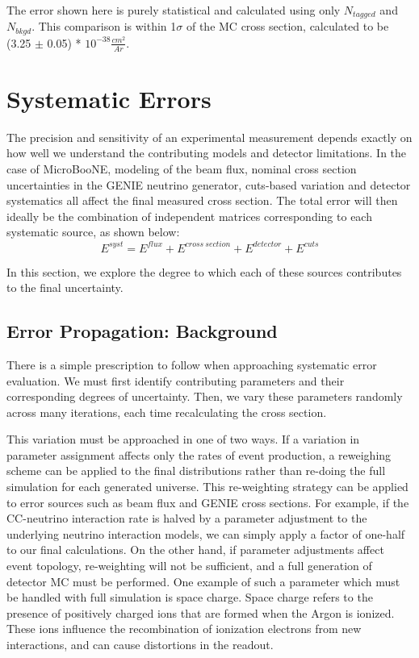 \documentclass[12pt]{article}
\begin{document}
The error shown here is purely statistical and calculated using only $N_{tagged}$ and $N_{bkgd}$. This comparison is within 1$\sigma$ of the MC cross section, calculated to be (3.25 $\pm$ 0.05) * $10^{-38} \frac{cm^2}{Ar}$.

\clearpage
\section{Systematic Errors}
The precision and sensitivity of an experimental measurement depends exactly on how well we understand the contributing models and detector limitations. In the case of MicroBooNE, modeling of the beam flux, nominal cross section uncertainties in the GENIE neutrino generator, cuts-based variation and detector systematics all affect the final measured cross section. The total error will then ideally be the combination of independent matrices corresponding to each systematic source, as shown below:
\begin{equation}
\label{eq:sys_error}
E^{syst} = E^{flux} + E^{cross\ section} + E^{detector} + E^{cuts}
\end{equation}

\noindent In this section, we explore the degree to which each of these sources contributes to the final uncertainty. 
\subsection{Error Propagation: Background} 
There is a simple prescription to follow when approaching systematic error evaluation. We must first identify contributing parameters and their corresponding degrees of uncertainty.  Then, we vary these parameters randomly across many iterations, each time recalculating the cross section.
\par This variation must be approached in one of two ways. If a variation in parameter assignment affects only the rates of event production, a reweighing scheme can be applied to the final distributions rather than re-doing the full simulation for each generated universe.  This re-weighting strategy can be applied to error sources such as beam flux and GENIE cross sections.  For example, if the CC-neutrino interaction rate is halved by a parameter adjustment to the underlying neutrino interaction models, we can simply apply a factor of one-half to our final calculations.  On the other hand, if parameter adjustments affect event topology, re-weighting will not be sufficient, and a full generation of detector MC must be performed. One example of such a parameter which must be handled with full simulation is space charge. Space charge refers to the presence of positively charged ions that are formed when the Argon is ionized.  These ions influence the recombination of ionization electrons from new interactions, and can cause distortions in the readout.
\end{document}
